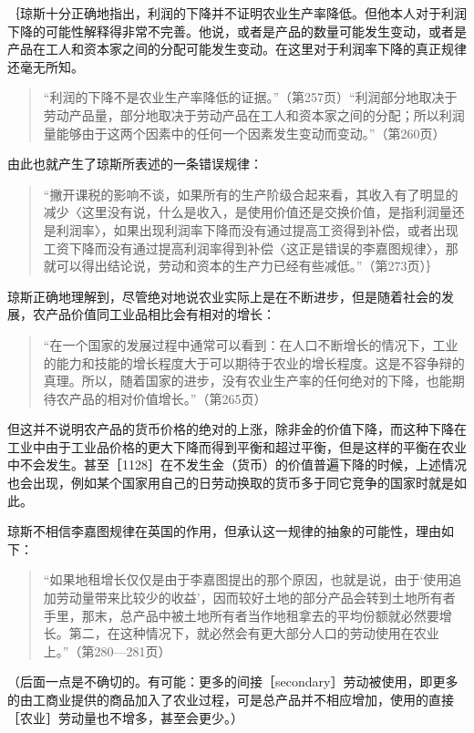 ｛琼斯十分正确地指出，利润的下降并不证明农业生产率降低。但他本人对于利润下降的可能性解释得非常不完善。他说，或者是产品的数量可能发生变动，或者是产品在工人和资本家之间的分配可能发生变动。在这里对于利润率下降的真正规律还毫无所知。

\begin{quote}{“利润的下降不是农业生产率降低的证据。”（第257页）“利润部分地取决于劳动产品量，部分地取决于劳动产品在工人和资本家之间的分配；所以利润量能够由于这两个因素中的任何一个因素发生变动而变动。”（第260页）}\end{quote}

由此也就产生了琼斯所表述的一条错误规律：

\begin{quote}{“撇开课税的影响不谈，如果所有的生产阶级合起来看，其收入有了明显的减少〈这里没有说，什么是收入，是使用价值还是交换价值，是指利润量还是利润率〉，如果出现利润率下降而没有通过提高工资得到补偿，或者出现工资下降而没有通过提高利润率得到补偿〈这正是错误的李嘉图规律〉，那就可以得出结论说，劳动和资本的生产力已经有些减低。”（第273页）｝}\end{quote}

琼斯正确地理解到，尽管绝对地说农业实际上是在不断进步，但是随着社会的发展，农产品价值同工业品相比会有相对的增长：

\begin{quote}{“在一个国家的发展过程中通常可以看到：在人口不断增长的情况下，工业的能力和技能的增长程度大于可以期待于农业的增长程度。这是不容争辩的真理。所以，随着国家的进步，没有农业生产率的任何绝对的下降，也能期待农产品的相对价值增长。”（第265页）}\end{quote}

但这并不说明农产品的货币价格的绝对的上涨，除非金的价值下降，而这种下降在工业中由于工业品价格的更大下降而得到平衡和超过平衡，但是这样的平衡在农业中不会发生。甚至［1128］在不发生金（货币）的价值普遍下降的时候，上述情况也会出现，例如某个国家用自己的日劳动换取的货币多于同它竞争的国家时就是如此。

琼斯不相信李嘉图规律在英国的作用，但承认这一规律的抽象的可能性，理由如下：

\begin{quote}{“如果地租增长仅仅是由于李嘉图提出的那个原因，也就是说，由于‘使用追加劳动量带来比较少的收益’，因而较好土地的部分产品会转到土地所有者手里，那末，总产品中被土地所有者当作地租拿去的平均份额就必然要增长。第二，在这种情况下，就必然会有更大部分人口的劳动使用在农业上。”（第280—281页）}\end{quote}

（后面一点是不确切的。有可能：更多的间接［secondary］劳动被使用，即更多的由工商业提供的商品加入了农业过程，可是总产品并不相应增加，使用的直接［农业］劳动量也不增多，甚至会更少。）

